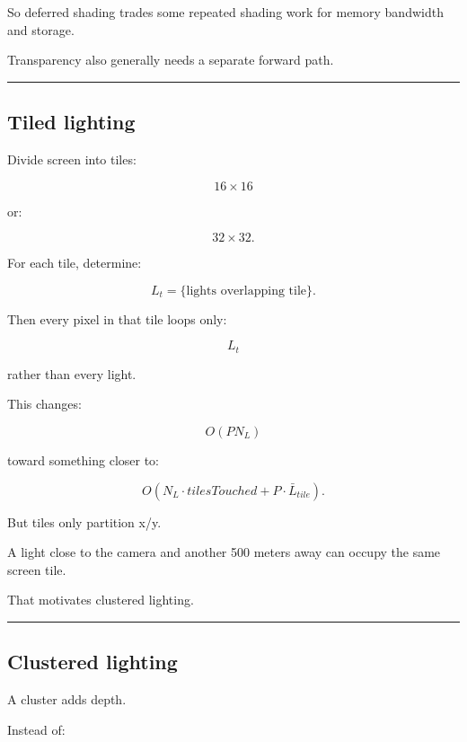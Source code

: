 So deferred shading trades some repeated shading work for memory bandwidth and storage.

Transparency also generally needs a separate forward path.

\begin{center}\rule{0.5\linewidth}{0.5pt}\end{center}

\subsection{Tiled lighting}\label{04-visual-computing-ii-ch040-tiled-lighting}

\hypertarget{04-visual-computing-ii-ch040-tiled-lighting}{}

Divide screen into tiles:

\[
16\times16
\]

or:

\[
32\times32.
\]

For each tile, determine:

\[
L_t=
\{\text{lights overlapping tile}\}.
\]

Then every pixel in that tile loops only:

\[
L_t
\]

rather than every light.

This changes:

\[
O(PN_L)
\]

toward something closer to:

\[
O(
N_L\cdot tilesTouched
+
P\cdot \bar L_{tile}
).
\]

But tiles only partition x/y.

A light close to the camera and another 500 meters away can occupy the same screen tile.

That motivates clustered lighting.

\begin{center}\rule{0.5\linewidth}{0.5pt}\end{center}

\subsection{Clustered lighting}\label{04-visual-computing-ii-ch040-clustered-lighting}

\hypertarget{04-visual-computing-ii-ch040-clustered-lighting}{}

A cluster adds depth.

Instead of:

